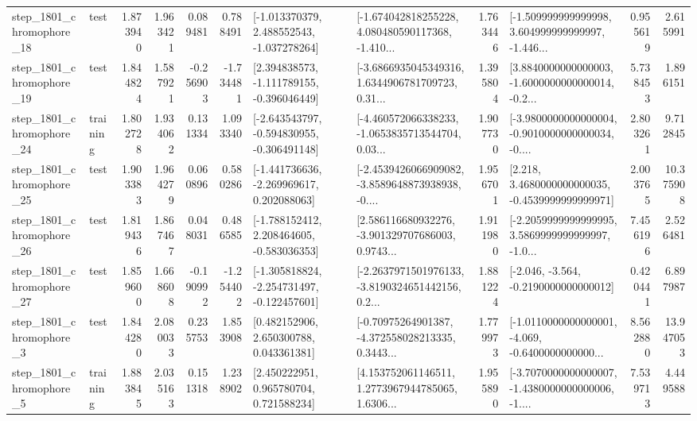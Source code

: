 \begin{tabular}{llrrrrllrlrr}
 step\_1801\_chromophore\_18 &      test &      1.873940 &    1.963421 &      0.089481 &  0.788491 &   [-1.013370379, 2.488552543, -1.037278264] &  [-1.674042818255228, 4.080480590117368, -1.410... &       1.763446 &  [-1.509999999999998, 3.604999999999997, -1.446... &            0.955619 &          2.615991 \\
 step\_1801\_chromophore\_19 &      test &      1.844824 &    1.587921 &     -0.256903 & -1.734481 &   [2.394838573, -1.111789155, -0.396046449] &  [-3.6866935045349316, 1.6344906781709723, 0.31... &       1.395804 &  [3.8840000000000003, -1.6000000000000014, -0.2... &            5.738453 &          1.896151 \\
 step\_1801\_chromophore\_24 &  training &      1.802728 &    1.934062 &      0.131334 &  1.093340 &  [-2.643543797, -0.594830955, -0.306491148] &  [-4.460572066338233, -1.0653835713544704, 0.03... &       1.907730 &  [-3.9800000000000004, -0.9010000000000034, -0.... &            2.803261 &          9.712845 \\
 step\_1801\_chromophore\_25 &      test &      1.903383 &    1.964279 &      0.060896 &  0.580286 &   [-1.441736636, -2.269969617, 0.202088063] &  [-2.4539426066909082, -3.8589648873938938, -0.... &       1.956701 &   [2.218, 3.4680000000000035, -0.4539999999999971] &            2.003765 &         10.375908 \\
 step\_1801\_chromophore\_26 &      test &      1.819436 &    1.867467 &      0.048031 &  0.486585 &   [-1.788152412, 2.208464605, -0.583036353] &  [2.586116680932276, -3.901329707686003, 0.9743... &       1.911980 &  [-2.2059999999999995, 3.5869999999999997, -1.0... &            7.456196 &          2.526481 \\
 step\_1801\_chromophore\_27 &      test &      1.859600 &    1.668608 &     -0.190992 & -1.254402 &  [-1.305818824, -2.254731497, -0.122457601] &  [-2.2637971501976133, -3.8190324651442156, 0.2... &       1.881224 &              [-2.046, -3.564, -0.2190000000000012] &            0.420441 &          6.897987 \\
  step\_1801\_chromophore\_3 &      test &      1.844280 &    2.080033 &      0.235753 &  1.853908 &     [0.482152906, 2.650300788, 0.043361381] &  [-0.70975264901387, -4.372558028213335, 0.3443... &       1.779973 &  [-1.0110000000000001, -4.069, -0.6400000000000... &            8.562880 &         13.947053 \\
  step\_1801\_chromophore\_5 &  training &      1.883845 &    2.035163 &      0.151318 &  1.238902 &     [2.450222951, 0.965780704, 0.721588234] &  [4.153752061146511, 1.2773967944785065, 1.6306... &       1.955890 &  [-3.7070000000000007, -1.4380000000000006, -1.... &            7.539713 &          4.449588 \\

\end{tabular}
